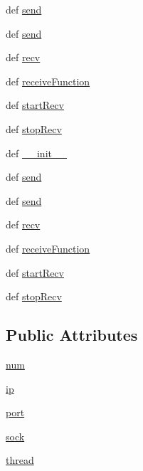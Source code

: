 \begin{DoxyCompactItemize}
def \hyperlink{classnetwork_1_1NETWORK__CORE_1_1UDPChannel_ada99dd7f7ad27fc1db37062daf953e1c}{send}
\item 
def \hyperlink{classnetwork_1_1NETWORK__CORE_1_1UDPChannel_ada99dd7f7ad27fc1db37062daf953e1c}{send}
\item 
def \hyperlink{classnetwork_1_1NETWORK__CORE_1_1UDPChannel_a3b4c88da7b885083e8aa44aef436e8e6}{recv}
\item 
def \hyperlink{classnetwork_1_1NETWORK__CORE_1_1UDPChannel_a6edcb5683390f03f4b72e0525bc4e1f7}{receive\+Function}
\item 
def \hyperlink{classnetwork_1_1NETWORK__CORE_1_1UDPChannel_a713bd6e7b9bbe515669fe8e23981be8d}{start\+Recv}
\item 
def \hyperlink{classnetwork_1_1NETWORK__CORE_1_1UDPChannel_aa5a9c175e34181c0aa2b49ad2f9b10f6}{stop\+Recv}
\item 
def \hyperlink{classnetwork_1_1NETWORK__CORE_1_1UDPChannel_a628f06fad9f7da98bbc9b5b6630271ea}{\+\_\+\+\_\+init\+\_\+\+\_\+}
\item 
def \hyperlink{classnetwork_1_1NETWORK__CORE_1_1UDPChannel_ada99dd7f7ad27fc1db37062daf953e1c}{send}
\item 
def \hyperlink{classnetwork_1_1NETWORK__CORE_1_1UDPChannel_ada99dd7f7ad27fc1db37062daf953e1c}{send}
\item 
def \hyperlink{classnetwork_1_1NETWORK__CORE_1_1UDPChannel_a3b4c88da7b885083e8aa44aef436e8e6}{recv}
\item 
def \hyperlink{classnetwork_1_1NETWORK__CORE_1_1UDPChannel_a6edcb5683390f03f4b72e0525bc4e1f7}{receive\+Function}
\item 
def \hyperlink{classnetwork_1_1NETWORK__CORE_1_1UDPChannel_a713bd6e7b9bbe515669fe8e23981be8d}{start\+Recv}
\item 
def \hyperlink{classnetwork_1_1NETWORK__CORE_1_1UDPChannel_aa5a9c175e34181c0aa2b49ad2f9b10f6}{stop\+Recv}
\end{DoxyCompactItemize}
\subsection*{Public Attributes}
\begin{DoxyCompactItemize}
\item 
\hyperlink{classnetwork_1_1NETWORK__CORE_1_1UDPChannel_a109eaf924bea52d095c5ecf68eb105ca}{num}
\item 
\hyperlink{classnetwork_1_1NETWORK__CORE_1_1UDPChannel_afc8c05885afa164854d35e9ce5a5cca9}{ip}
\item 
\hyperlink{classnetwork_1_1NETWORK__CORE_1_1UDPChannel_a020849db64086f44fb76565a2fac454e}{port}
\item 
\hyperlink{classnetwork_1_1NETWORK__CORE_1_1UDPChannel_aea64337d89b2d361b8631e0c54316567}{sock}
\item 
\hyperlink{classnetwork_1_1NETWORK__CORE_1_1UDPChannel_a8cead572d015248b58dafbcb0e7f4043}{thread}
\end{DoxyCompactItemize}
